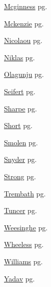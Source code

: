 \item \hyperlink{Mcginness.1}{Mcginness} pg. \pageref{abs:Mcginness}
\item \hyperlink{Mckenzie.1}{Mckenzie} pg. \pageref{abs:Mckenzie}
\item \hyperlink{Nicolaou.1}{Nicolaou} pg. \pageref{abs:Nicolaou}
\item \hyperlink{Niklas.1}{Niklas} pg. \pageref{abs:Niklas}
\item \hyperlink{Olagunju.1}{Olagunju} pg. \pageref{abs:Olagunju}
\item \hyperlink{Seifert.1}{Seifert} pg. \pageref{abs:Seifert}
\item \hyperlink{Sharpe.1}{Sharpe} pg. \pageref{abs:Sharpe}
\item \hyperlink{Short.1}{Short} pg. \pageref{abs:Short}
\item \hyperlink{Smolen.1}{Smolen} pg. \pageref{abs:Smolen}
\item \hyperlink{Snyder.1}{Snyder} pg. \pageref{abs:Snyder}
\item \hyperlink{Strong.1}{Strong} pg. \pageref{abs:Strong}
\item \hyperlink{Trembath.1}{Trembath} pg. \pageref{abs:Trembath}
\item \hyperlink{Tuncer.1}{Tuncer} pg. \pageref{abs:Tuncer}
\item \hyperlink{Weesinghe.1}{Weesinghe} pg. \pageref{abs:Weesinghe}
\item \hyperlink{Wheeless.1}{Wheeless} pg. \pageref{abs:Wheeless}
\item \hyperlink{Williams.1}{Williams} pg. \pageref{abs:Williams}
\item \hyperlink{Yadav.1}{Yadav} pg. \pageref{abs:Yadav}
